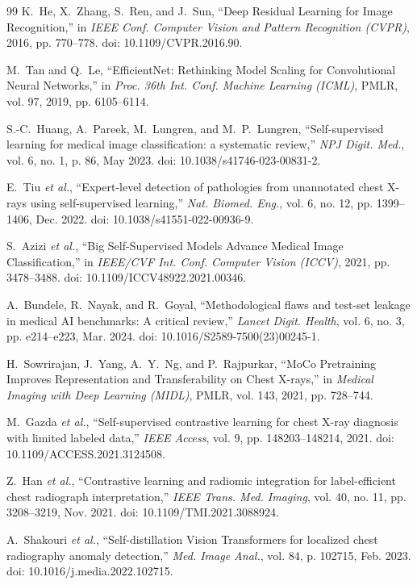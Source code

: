 \documentclass[journal,article,submit,moreauthors,pdftex]{Definitions/tsp}
\begin{document}
\begin{thebibliography}{99}
K.~He, X.~Zhang, S.~Ren, and J.~Sun, ``Deep Residual Learning for Image Recognition,'' in \emph{IEEE Conf. Computer Vision and Pattern Recognition (CVPR)}, 2016, pp. 770--778. doi: 10.1109/CVPR.2016.90.

M.~Tan and Q.~Le, ``EfficientNet: Rethinking Model Scaling for Convolutional Neural Networks,'' in \emph{Proc. 36th Int. Conf. Machine Learning (ICML)}, PMLR, vol. 97, 2019, pp. 6105--6114.

S.-C.~Huang, A.~Pareek, M.~Lungren, and M.~P.~Lungren, ``Self-supervised learning for medical image classification: a systematic review,'' \emph{NPJ Digit. Med.}, vol. 6, no. 1, p. 86, May 2023. doi: 10.1038/s41746-023-00831-2.

E.~Tiu \emph{et al.}, ``Expert-level detection of pathologies from unannotated chest X-rays using self-supervised learning,'' \emph{Nat. Biomed. Eng.}, vol. 6, no. 12, pp. 1399--1406, Dec. 2022. doi: 10.1038/s41551-022-00936-9.

S.~Azizi \emph{et al.}, ``Big Self-Supervised Models Advance Medical Image Classification,'' in \emph{IEEE/CVF Int. Conf. Computer Vision (ICCV)}, 2021, pp. 3478--3488. doi: 10.1109/ICCV48922.2021.00346.

A.~Bundele, R.~Nayak, and R.~Goyal, ``Methodological flaws and test-set leakage in medical AI benchmarks: A critical review,'' \emph{Lancet Digit. Health}, vol. 6, no. 3, pp. e214--e223, Mar. 2024. doi: 10.1016/S2589-7500(23)00245-1.

H.~Sowrirajan, J.~Yang, A.~Y.~Ng, and P.~Rajpurkar, ``MoCo Pretraining Improves Representation and Transferability on Chest X-rays,'' in \emph{Medical Imaging with Deep Learning (MIDL)}, PMLR, vol. 143, 2021, pp. 728--744.

M.~Gazda \emph{et al.}, ``Self-supervised contrastive learning for chest X-ray diagnosis with limited labeled data,'' \emph{IEEE Access}, vol. 9, pp. 148203--148214, 2021. doi: 10.1109/ACCESS.2021.3124508.

Z.~Han \emph{et al.}, ``Contrastive learning and radiomic integration for label-efficient chest radiograph interpretation,'' \emph{IEEE Trans. Med. Imaging}, vol. 40, no. 11, pp. 3208--3219, Nov. 2021. doi: 10.1109/TMI.2021.3088924.

A.~Shakouri \emph{et al.}, ``Self-distillation Vision Transformers for localized chest radiography anomaly detection,'' \emph{Med. Image Anal.}, vol. 84, p. 102715, Feb. 2023. doi: 10.1016/j.media.2022.102715.


\end{thebibliography}
\end{document}
